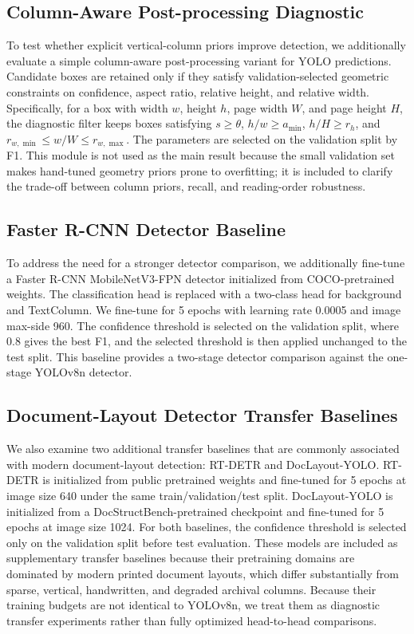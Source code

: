 \documentclass[pdflatex,sn-mathphys-num]{sn-jnl}
\begin{document}
\subsection{Column-Aware Post-processing Diagnostic}
To test whether explicit vertical-column priors improve detection, we additionally evaluate a simple column-aware post-processing variant for YOLO predictions. Candidate boxes are retained only if they satisfy validation-selected geometric constraints on confidence, aspect ratio, relative height, and relative width. Specifically, for a box with width $w$, height $h$, page width $W$, and page height $H$, the diagnostic filter keeps boxes satisfying $s\geq\theta$, $h/w\geq a_{\min}$, $h/H\geq r_h$, and $r_{w,\min}\leq w/W\leq r_{w,\max}$. The parameters are selected on the validation split by F1. This module is not used as the main result because the small validation set makes hand-tuned geometry priors prone to overfitting; it is included to clarify the trade-off between column priors, recall, and reading-order robustness.

\subsection{Faster R-CNN Detector Baseline}
To address the need for a stronger detector comparison, we additionally fine-tune a Faster R-CNN MobileNetV3-FPN detector initialized from COCO-pretrained weights. The classification head is replaced with a two-class head for background and TextColumn. We fine-tune for 5 epochs with learning rate 0.0005 and image max-side 960. The confidence threshold is selected on the validation split, where 0.8 gives the best F1, and the selected threshold is then applied unchanged to the test split. This baseline provides a two-stage detector comparison against the one-stage YOLOv8n detector.

\subsection{Document-Layout Detector Transfer Baselines}
We also examine two additional transfer baselines that are commonly associated with modern document-layout detection: RT-DETR and DocLayout-YOLO. RT-DETR is initialized from public pretrained weights and fine-tuned for 5 epochs at image size 640 under the same train/validation/test split. DocLayout-YOLO is initialized from a DocStructBench-pretrained checkpoint and fine-tuned for 5 epochs at image size 1024. For both baselines, the confidence threshold is selected only on the validation split before test evaluation. These models are included as supplementary transfer baselines because their pretraining domains are dominated by modern printed document layouts, which differ substantially from sparse, vertical, handwritten, and degraded archival columns. Because their training budgets are not identical to YOLOv8n, we treat them as diagnostic transfer experiments rather than fully optimized head-to-head comparisons.
\end{document}
